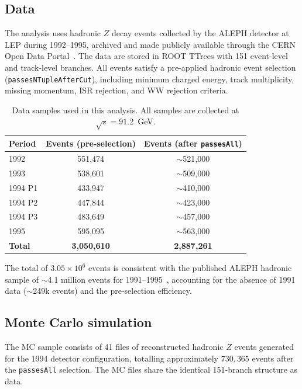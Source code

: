 \documentclass[11pt,a4paper]{article}
\begin{document}
\subsection{Data}
\label{sec:data:data}

The analysis uses hadronic $Z$ decay events collected by the ALEPH
detector at LEP during 1992--1995, archived and made publicly
available through the CERN Open Data Portal~\cite{ALEPH:opendata}.
The data are stored in ROOT TTrees with 151 event-level and
track-level branches.
All events satisfy a pre-applied hadronic event selection
(\texttt{passesNTupleAfterCut}), including minimum charged energy,
track multiplicity, missing momentum, ISR rejection, and WW rejection
criteria.

\begin{table}[htbp]
\centering
\caption{Data samples used in this analysis. All samples are
collected at $\sqrt{s} = 91.2$~GeV.}
\label{tbl:data}
\begin{tabular}{lcc}
\toprule
Period & Events (pre-selection) & Events (after \texttt{passesAll}) \\
\midrule
1992 & 551,474 & $\sim$521,000 \\
1993 & 538,601 & $\sim$509,000 \\
1994 P1 & 433,947 & $\sim$410,000 \\
1994 P2 & 447,844 & $\sim$423,000 \\
1994 P3 & 483,649 & $\sim$457,000 \\
1995 & 595,095 & $\sim$563,000 \\
\midrule
\textbf{Total} & \textbf{3,050,610} & \textbf{2,887,261} \\
\bottomrule
\end{tabular}
\end{table}

The total of $3.05 \times 10^6$ events is consistent with the
published ALEPH hadronic sample of $\sim$4.1 million events for
1991--1995~\cite{ALEPH:AFBb}, accounting for the absence of 1991
data ($\sim$249k events) and the pre-selection efficiency.

\subsection{Monte Carlo simulation}
\label{sec:data:mc}

The MC sample consists of 41 files of reconstructed hadronic $Z$
events generated for the 1994 detector configuration, totalling
approximately $730{,}365$ events after the \texttt{passesAll}
selection.
The MC files share the identical 151-branch structure as data.
\end{document}
